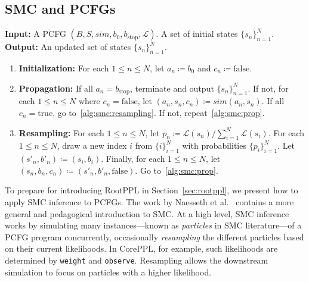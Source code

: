 \documentclass[runningheads]{llncs}
\newcommand{\clstinline}{\lstinline[language=CorePPL]}
\begin{document}

\subsection{SMC and PCFGs}\label{sec:smcpcfg}
\begin{algorithm}[tb]
  \caption{%
    A standard SMC algorithm applied to PCFGs.
  }%
  \label{alg:smc}
  \textbf{Input:} A PCFG $(B,S,\mathit{sim},b_0,b_\text{stop},\mathcal{L})$. A set of initial states $\{s_n\}_{n=1}^N$. \\
  \textbf{Output:} An updated set of states $\{s_n\}_{n=1}^N$.
  \begin{enumerate}

    \item \textbf{Initialization:}
      For each $1 \leq n \leq N$, let $a_n \coloneqq b_0$ and $c_n \coloneqq \text{false}$.

    \item \textbf{Propagation:}
      \label{alg:smc:prop}
      If all $a_n = b_\text{stop}$, terminate and output $\{s_n\}_{n=1}^N$.
      If not, for each $1 \leq n \leq N$ where $c_n = \text{false}$, let $(a_n,s_n,c_n) \coloneqq \mathit{sim}(a_n,s_n)$.
      If all $c_n = \text{true}$, go to~\ref{alg:smc:resampling}.
      If not, repeat~\ref{alg:smc:prop}.

    \item \textbf{Resampling:}
      \label{alg:smc:resampling}
      For each $1 \leq n \leq N$, let $p_n \coloneqq \mathcal{L}(s_n) / \sum_{i=1}^N \mathcal{L}(s_i)$.
      For each $1 \leq n \leq N$, draw a new index $i$ from $\{i\}_{i=1}^N$ with probabilities $\{p_i\}_{i=1}^N$. Let $(s'_n,b'_n) \coloneqq (s_i,b_i)$. Finally, for each $1 \leq n \leq N$, let $(s_n,b_n,c_n) \coloneqq (s'_n,b'_n,\text{false})$.
      Go to~\ref{alg:smc:prop}.

  \end{enumerate}
\end{algorithm}

To prepare for introducing RootPPL in Section~\ref{sec:rootppl}, we present how to apply SMC inference to PCFGs.
The work by Naesseth et al.~\cite{naesseth2019elements} contains a more general and pedagogical introduction to SMC.
At a high level, SMC inference works by simulating many instances---known as \emph{particles} in SMC literature---of a PCFG program concurrently, occasionally \emph{resampling} the different particles based on their current likelihoods.
In CorePPL, for example, such likelihoods are determined by \clstinline!weight! and \clstinline!observe!.
Resampling allows the downstream simulation to focus on particles with a higher likelihood.
\end{document}
